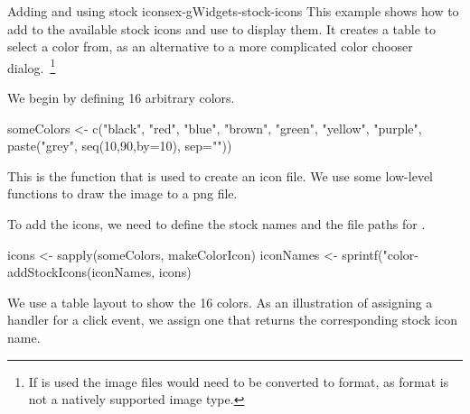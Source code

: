 \begin{example}{Adding and using stock icons}{ex-gWidgets-stock-icons}
This example shows how to add to the available stock icons and use
 to display them. It creates a table to select a color
from, as an alternative to a more complicated color chooser
dialog.~\footnote{If   is used the image files would need to be
converted to  format, as  format is not a natively
supported image type.}

We begin by defining 16 arbitrary colors.

\begin{Schunk}
\begin{Sinput}
 someColors <- c("black", "red", "blue", "brown",
                 "green", "yellow", "purple",
                 paste("grey", seq(10,90,by=10), sep=""))
\end{Sinput}
\end{Schunk}

This is the function that is used to create an icon file. We use some
low-level  functions to draw the image to a png file.
\begin{Schunk}
\end{Schunk}

To add the icons, we need to define the stock names and the file paths
for .

\begin{Schunk}
\begin{Sinput}
 icons <- sapply(someColors, makeColorIcon)
 iconNames <- sprintf("color-%
 addStockIcons(iconNames, icons)
\end{Sinput}
\end{Schunk}

We use a table layout to show the 16 colors. As an illustration of
assigning a handler for a click event, we assign one that returns the
corresponding stock icon name.

\begin{Schunk}
\end{Schunk}
\end{example}

